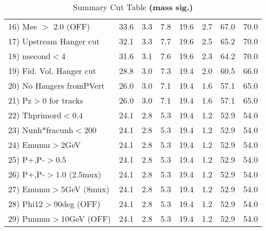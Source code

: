 \begin{table}[h!]
{{\begin{tabular}{||l||r|r|r|r|r||r||r||}
 16) Mee $>$ 2.0  (OFF)   &      33.6 &       3.3 &       7.8 &      19.6 &       2.7 &      67.0 &      70.0 \\
 17) Upstream Hanger cut  &      32.1 &       3.3 &       7.7 &      19.6 &       2.5 &      65.2 &      70.0 \\
 18) nsecond$<$4          &      31.6 &       3.1 &       7.6 &      19.6 &       2.3 &      64.2 &      70.0 \\
 19) Fid. Vol. Hanger cut &      28.8 &       3.0 &       7.3 &      19.4 &       2.0 &      60.5 &      66.0 \\
 20) No Hangers fromPVert &      26.0 &       3.0 &       7.1 &      19.4 &       1.6 &      57.1 &      65.0 \\
 21) Pz$>$0 for tracks    &      26.0 &       3.0 &       7.1 &      19.4 &       1.6 &      57.1 &      65.0 \\
 22) Thprimord$<$0.4      &      24.1 &       2.8 &       5.3 &      19.4 &       1.2 &      52.9 &      54.0 \\
 23) Nunh*fracunh$<$200   &      24.1 &       2.8 &       5.3 &      19.4 &       1.2 &      52.9 &      54.0 \\
 24) Emumu$>$2GeV         &      24.1 &       2.8 &       5.3 &      19.4 &       1.2 &      52.9 &      54.0 \\
 25) P+,P-$>$0.5          &      24.1 &       2.8 &       5.3 &      19.4 &       1.2 &      52.9 &      54.0 \\
 26) P+,P-$>$1.0 (2.5mux) &      24.1 &       2.8 &       5.3 &      19.4 &       1.2 &      52.9 &      54.0 \\
 27) Emumu$>$5GeV  (8mux) &      24.1 &       2.8 &       5.3 &      19.4 &       1.2 &      52.9 &      54.0 \\
 28) Phi12$>$90deg  (OFF) &      24.1 &       2.8 &       5.3 &      19.4 &       1.2 &      52.9 &      54.0 \\
 29) Pmumu$>$10GeV  (OFF) &      24.1 &       2.8 &       5.3 &      19.4 &       1.2 &      52.9 &      54.0 \\
 \hline
 \hline
 \end{tabular}
 \caption{Summary Cut Table \textbf{ (mass sig.) }}
 \label{tab-sumcut}
 }}
 \end{table}
 \endinput

